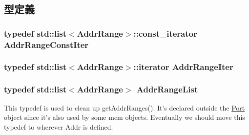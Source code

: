 \subsection{型定義}
\hypertarget{port_8hh_a0f4385f0a7bf93ed2e39e1a630b291b0}{
\subsubsection[{AddrRangeConstIter}]{\setlength{\rightskip}{0pt plus 5cm}typedef {\bf std::list}$<${\bf AddrRange}$>$::const\_\-iterator {\bf AddrRangeConstIter}}}
\label{port_8hh_a0f4385f0a7bf93ed2e39e1a630b291b0}
\hypertarget{port_8hh_a5f27b286a946c7b1f93f37faecf43476}{
\subsubsection[{AddrRangeIter}]{\setlength{\rightskip}{0pt plus 5cm}typedef {\bf std::list}$<${\bf AddrRange}$>$::iterator {\bf AddrRangeIter}}}
\label{port_8hh_a5f27b286a946c7b1f93f37faecf43476}
\hypertarget{port_8hh_a8f73751754cd29dbff43400e751325c0}{
\subsubsection[{AddrRangeList}]{\setlength{\rightskip}{0pt plus 5cm}typedef {\bf std::list}$<${\bf AddrRange}$>$ {\bf AddrRangeList}}}
\label{port_8hh_a8f73751754cd29dbff43400e751325c0}
This typedef is used to clean up getAddrRanges(). It's declared outside the \hyperlink{classPort}{Port} object since it's also used by some mem objects. Eventually we should move this typedef to wherever Addr is defined. 